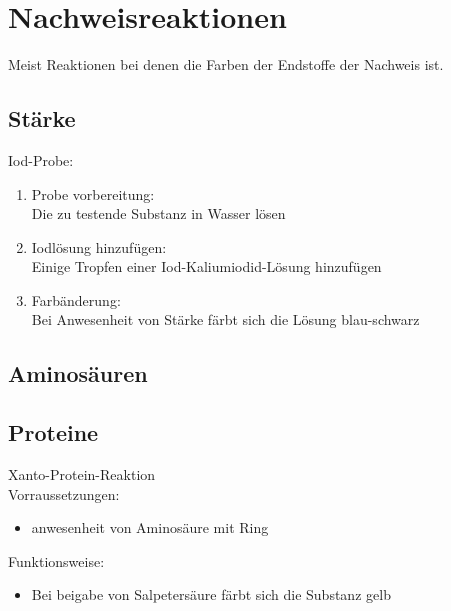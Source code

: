 \section{Nachweisreaktionen}
Meist Reaktionen bei denen die Farben der Endstoffe der Nachweis ist.

\subsection{Stärke}
Iod-Probe:
\begin{enumerate}
    \item Probe vorbereitung: \\
        Die zu testende Substanz in Wasser lösen
    \item Iodlösung hinzufügen: \\
        Einige Tropfen einer Iod-Kaliumiodid-Lösung hinzufügen
    \item Farbänderung: \\
        Bei Anwesenheit von Stärke färbt sich die Lösung blau-schwarz
\end{enumerate}

\subsection{Aminosäuren}

\subsection{Proteine}
Xanto-Protein-Reaktion \\
Vorraussetzungen:
\begin{itemize}
    \item anwesenheit von Aminosäure mit Ring
\end{itemize}
Funktionsweise: 
\begin{itemize}
    \item Bei beigabe von Salpetersäure färbt sich die Substanz gelb
\end{itemize}
